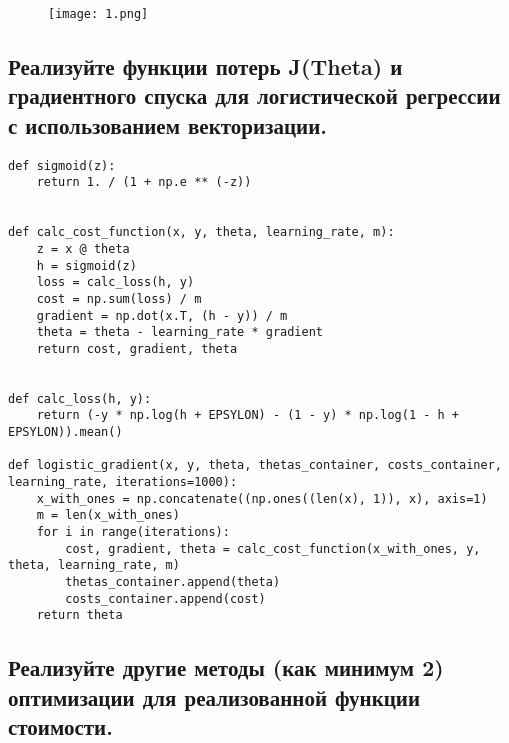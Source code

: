 \begin{figure}[h]
\centering
	\texttt{[image: 1.png]}
	\label{sec:purpose:payings}
\end{figure}

\subsection{Реализуйте функции потерь J(Theta) и градиентного спуска для логистической регрессии с использованием векторизации.}

\begin{lstlisting}
def sigmoid(z):
    return 1. / (1 + np.e ** (-z))


def calc_cost_function(x, y, theta, learning_rate, m):
    z = x @ theta
    h = sigmoid(z)
    loss = calc_loss(h, y)
    cost = np.sum(loss) / m
    gradient = np.dot(x.T, (h - y)) / m
    theta = theta - learning_rate * gradient
    return cost, gradient, theta


def calc_loss(h, y):
    return (-y * np.log(h + EPSYLON) - (1 - y) * np.log(1 - h + EPSYLON)).mean()

def logistic_gradient(x, y, theta, thetas_container, costs_container, learning_rate, iterations=1000):
    x_with_ones = np.concatenate((np.ones((len(x), 1)), x), axis=1)
    m = len(x_with_ones)
    for i in range(iterations):
        cost, gradient, theta = calc_cost_function(x_with_ones, y, theta, learning_rate, m)
        thetas_container.append(theta)
        costs_container.append(cost)
    return theta
\end{lstlisting}

\subsection{Реализуйте другие методы (как минимум 2) оптимизации для реализованной функции стоимости.}

